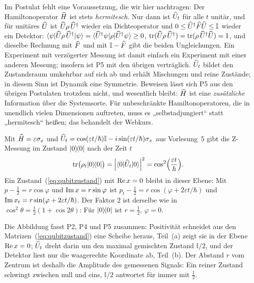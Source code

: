 Im Postulat fehlt eine Voraussetzung, die wir hier nachtragen: Der Hamiltonoperator $\widehat{H}$ ist stets \emph{hermitesch}. Nur dann ist $\widehat{U}_t$ für alle $t$ unitär, und für unitäres $\widehat{U}$ ist $\widehat{U}\rho\,\widehat{U}^{\dagger}$ wieder ein Dichteoperator und $0\leq\widehat{U}^{\dagger}\widehat{F}\widehat{U}\leq\mathbb{I}$ wieder ein Detektor: $\langle \psi \rvert \widehat{U}\rho\,\widehat{U}^{\dagger} \lvert \psi \rangle = \langle \widehat{U}^{\dagger}\psi \rvert \rho \lvert \widehat{U}^{\dagger}\psi \rangle\geq 0$, $\operatorname{tr}(\widehat{U}\rho\,\widehat{U}^{\dagger}) = \operatorname{tr}(\rho\,\widehat{U}^{\dagger}\widehat{U}) = 1$, und dieselbe Rechnung mit $\widehat{F}$ und mit $\mathbb{I}-\widehat{F}$ gibt die beiden Ungleichungen. Ein Experiment mit verzögerter Messung ist damit einfach ein Experiment mit einer anderen Messung; insofern ist P5 mit den übrigen verträglich. $\widehat{U}_t$ bildet den Zustandsraum umkehrbar auf sich ab und erhält Mischungen und reine Zustände; in diesem Sinn ist Dynamik eine Symmetrie. Beweisen lässt sich P5 aus den übrigen Postulaten trotzdem nicht, und wesentlich bleibt: $\widehat{H}$ ist eine \emph{zusätzliche} Information über die Systemsorte. Für unbeschränkte Hamiltonoperatoren, die in unendlich vielen Dimensionen auftreten, muss es „selbstadjungiert“ statt „hermitesch“ heißen; das behandelt der Webkurs.

\begin{beispiel}
Mit $\widehat{H} = \varepsilon\sigma_{x}$ und $\widehat{U}_t = \cos(\varepsilon t/\hbar)\mathbb{I} - i\sin(\varepsilon t/\hbar)\sigma_{x}$ aus Vorlesung~5 gibt die Z-Messung im Zustand $\lvert 0 \rangle\!\langle 0 \rvert$ nach der Zeit $t$
\begin{equation}
	\operatorname{tr}\bigl(\rho_t\lvert 0 \rangle\!\langle 0 \rvert\bigr) = \left\lvert \langle 0 \rvert \widehat{U}_t \lvert 0 \rangle \right\rvert^2 = \cos^2\Bigl(\frac{\varepsilon t}{\hbar}\Bigr).
\end{equation}
Ein Zustand~(\ref{eq:qubitzustand}) mit $\operatorname{Re} x = 0$ bleibt in dieser Ebene: Mit $p-\tfrac12 = r\cos\varphi$ und $\operatorname{Im} x = r\sin\varphi$ ist $p_t - \tfrac12 = r\cos(\varphi + 2\varepsilon t/\hbar)$ und $\operatorname{Im} x_t = r\sin(\varphi + 2\varepsilon t/\hbar)$. Der Faktor $2$ ist derselbe wie in $\cos^2\theta = \tfrac12(1 + \cos 2\theta)$: Für $\lvert 0 \rangle\!\langle 0 \rvert$ ist $r = \tfrac12$, $\varphi = 0$.
\end{beispiel}



Die Abbildung fasst P2, P4 und P5 zusammen: Positivität schneidet aus den Matrizen~(\ref{eq:qubitzustand}) eine Scheibe heraus, Teil~(a) zeigt sie in der Ebene $\operatorname{Re} x = 0$; $\widehat{U}_t$ dreht darin um den maximal gemischten Zustand $\mathbb{I}/2$, und der Detektor liest nur die waagerechte Koordinate ab, Teil~(b). Der Abstand $r$ vom Zentrum ist deshalb die Amplitude des gemessenen Signals: Ein reiner Zustand schwingt zwischen null und eins, $\mathbb{I}/2$ antwortet für immer mit $\tfrac12$.

